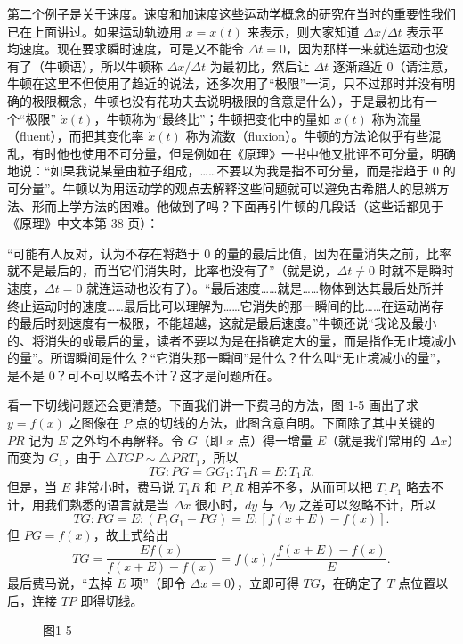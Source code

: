 第二个例子是关于速度。速度和加速度这些运动学概念的研究在当时的重要性我们已在上面讲过。如果运动轨迹用 $x=x(t)$ 来表示，则大家知道 $\Delta x/\Delta t$ 表示平均速度。现在要求瞬时速度，可是又不能令 $\Delta t=0$，因为那样一来就连运动也没有了（牛顿语），所以牛顿称 $\Delta x/\Delta t$ 为最初比，然后让 $\Delta t$ 逐渐趋近 $0$（请注意，牛顿在这里不但使用了趋近的说法，还多次用了“极限”一词，只不过那时并没有明确的极限概念，牛顿也没有花功夫去说明极限的含意是什么），于是最初比有一个“极限” $\dot x(t)$，牛顿称为“最终比”；牛顿把变化中的量如 $x(t)$ 称为流量（fluent），而把其变化率 $\dot x(t)$ 称为流数（fluxion）。牛顿的方法论似乎有些混乱，有时他也使用不可分量，但是例如在《原理》一书中他又批评不可分量，明确地说：“如果我说某量由粒子组成，……不要以为我是指不可分量，而是指趋于 $0$ 的可分量”。牛顿以为用运动学的观点去解释这些问题就可以避免古希腊人的思辨方法、形而上学方法的困难。他做到了吗？下面再引牛顿的几段话（这些话都见于《原理》中文本第 38 页）：

“可能有人反对，认为不存在将趋于 $0$ 的量的最后比值，因为在量消失之前，比率就不是最后的，而当它们消失时，比率也没有了”（就是说，$\Delta t\ne0$ 时就不是瞬时速度，$\Delta t=0$ 就连运动也没有了）。“最后速度……就是……物体到达其最后处所并终止运动时的速度……最后比可以理解为……它消失的那一瞬间的比……在运动尚存的最后时刻速度有一极限，不能超越，这就是最后速度。”牛顿还说“我论及最小的、将消失的或最后的量，读者不要以为是在指确定大的量，而是指作无止境减小的量”。所谓瞬间是什么？“它消失那一瞬间”是什么？什么叫“无止境减小的量”，是不是 $0$？可不可以略去不计？这才是问题所在。

看一下切线问题还会更清楚。下面我们讲一下费马的方法，图 1-5 画出了求 $y=f(x)$ 之图像在 $P$ 点的切线的方法，此图含意自明。下面除了其中关键的 $PR$ 记为 $E$ 之外均不再解释。令 $G$（即 $x$ 点）得一增量 $E$（就是我们常用的 $\Delta x$）而变为 $G_1$，由于 $\triangle TGP\sim\triangle PRT_1$，所以
\[
TG:PG=GG_1:T_1R=E:T_1R.
\]
但是，当 $E$ 非常小时，费马说 $T_1R$ 和 $P_1R$ 相差不多，从而可以把 $T_1P_1$ 略去不计，用我们熟悉的语言就是当 $\Delta x$ 很小时，$dy$ 与 $\Delta y$ 之差可以忽略不计，所以
\[
TG:PG=E:(P_1G_1-PG)=E:[f(x+E)-f(x)].
\]
但 $PG=f(x)$，故上式给出
\[
TG=\frac{Ef(x)}{f(x+E)-f(x)}
=f(x)\bigg/\frac{f(x+E)-f(x)}{E}. \tag{7}
\]
最后费马说，“去掉 $E$ 项”（即令 $\Delta x=0$），立即可得 $TG$，在确定了 $T$ 点位置以后，连接 $TP$ 即得切线。

\begin{figure}[htbp]
\centering
{}
\caption*{图1-5}
\end{figure}

